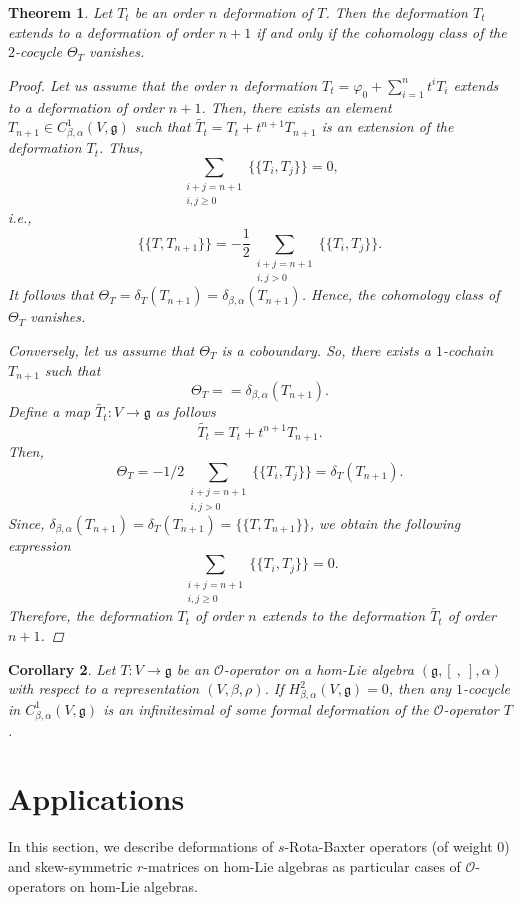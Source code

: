 \documentclass[a4paper,11pt]{amsart}
\theoremstyle{plain}
\newtheorem{theorem}{Theorem}[section]
\newtheorem{corollary}[theorem]{Corollary}
\theoremstyle{definition}
\theoremstyle{remark}
\numberwithin{equation}{section}
\begin{document}
\begin{theorem}\label{hom-Obst}
Let $T_t$ be an order $n$ deformation of $T$. Then the deformation $T_t$ extends to a deformation of order $n+1$ if and only if the cohomology class of the $2$-cocycle $\Theta_T$ vanishes.

\begin{proof}
Let us assume that the order $n$ deformation $\textstyle{T_t=\varphi_0+\sum^n_{i=1}t^i T_i }$ extends to a deformation of order $n+1$. Then, there exists an element $T_{n+1}\in C^1_{\beta,\alpha}(V,\mathfrak{g})$ such that 
$\widetilde{T_t}=T_t+t^{n+1} T_{n+1}$ is an extension of the deformation $T_t$. Thus,  
$$\sum_{\substack{i+j=n+1\\ i,j\geq 0}}\{\!\!\{T_i,T_j\}\!\!\}=0,$$
i.e.,
$$\{\!\!\{T,T_{n+1}\}\!\!\}=-\frac{1}{2} \sum_{\substack{i+j=n+1\\ i,j> 0}}\{\!\!\{T_i,T_j\}\!\!\}.$$
It follows that $\Theta_T=\delta_T(T_{n+1})=\delta_{\beta,\alpha}(T_{n+1})$. Hence, the cohomology class of $\Theta_T$ vanishes.

Conversely, let us assume that $\Theta_T$ is a coboundary. So, there exists a $1$-cochain $T_{n+1}$ such that 
$$
\Theta_T==\delta_{\beta,\alpha}(T_{n+1}). 
$$
Define a map $\widetilde{T_t}:V\rightarrow \mathfrak{g}$ as follows
$$
\widetilde{T_t}=T_t+t^{n+1}T_{n+1}.
$$
Then,
$$\Theta_T=-1/2\sum_{\substack{i+j=n+1\\i,j>0}}\{\!\!\{T_i,T_j\}\!\!\}=\delta_T(T_{n+1}).$$
Since, $\delta_{\beta,\alpha}(T_{n+1})=\delta_T(T_{n+1})=\{\!\!\{T,T_{n+1}\}\!\!\}$, we obtain the following expression
$$\sum_{\substack{i+j=n+1\\i,j\geq 0}}\{\!\!\{T_i,T_j\}\!\!\}=0.$$ 
Therefore, the deformation $T_t$ of order $n$ extends to the deformation $\widetilde{T_t}$ of order $n+1$.
\end{proof}

\end{theorem}

\begin{corollary}
Let $T:V\rightarrow \mathfrak{g}$ be an $\mathcal{O}$-operator on a hom-Lie algebra $(\mathfrak{g},[~,~],\alpha)$ with respect to a representation $(V,\beta,\rho)$. If $H^2_{\beta,\alpha}(V,\mathfrak{g})=0$, then any $1$-cocycle in $C^1_{\beta,\alpha}(V,\mathfrak{g})$ is an infinitesimal of some formal deformation of the $\mathcal{O}$-operator $T$.
\end{corollary}

\section{Applications}
In this section, we describe deformations of $s$-Rota-Baxter operators (of weight $0$) and skew-symmetric $r$-matrices on hom-Lie algebras as particular cases of $\mathcal{O}$-operators on hom-Lie algebras. 
\end{document}
